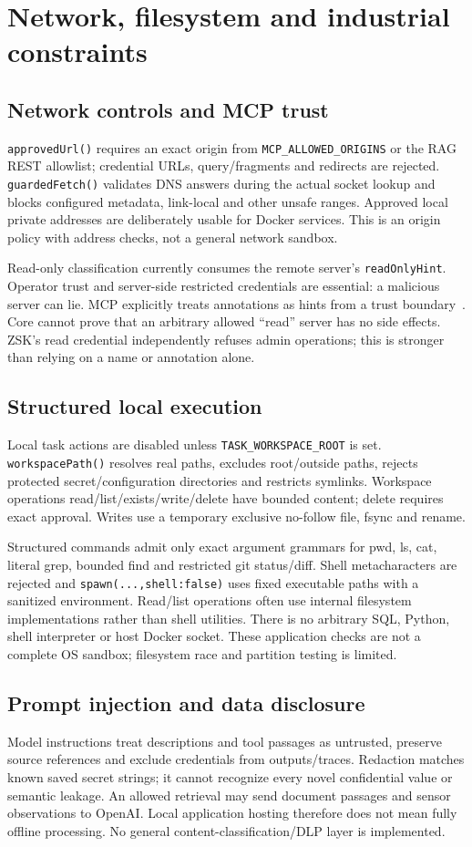 \section{Network, filesystem and industrial constraints}
\subsection{Network controls and MCP trust}
\texttt{approvedUrl()} requires an exact origin from \texttt{MCP\_ALLOWED\_ORIGINS} or the RAG REST allowlist; credential URLs, query/fragments and redirects are rejected. \texttt{guardedFetch()} validates DNS answers during the actual socket lookup and blocks configured metadata, link-local and other unsafe ranges. Approved local private addresses are deliberately usable for Docker services. This is an origin policy with address checks, not a general network sandbox.

Read-only classification currently consumes the remote server's \texttt{readOnlyHint}. Operator trust and server-side restricted credentials are essential: a malicious server can lie. MCP explicitly treats annotations as hints from a trust boundary~\cite{mcpannotations}. Core cannot prove that an arbitrary allowed ``read'' server has no side effects. ZSK's read credential independently refuses admin operations; this is stronger than relying on a name or annotation alone.
\subsection{Structured local execution}
Local task actions are disabled unless \texttt{TASK\_WORKSPACE\_ROOT} is set. \texttt{workspacePath()} resolves real paths, excludes root/outside paths, rejects protected secret/configuration directories and restricts symlinks. Workspace operations read/list/exists/write/delete have bounded content; delete requires exact approval. Writes use a temporary exclusive no-follow file, fsync and rename.

Structured commands admit only exact argument grammars for pwd, ls, cat, literal grep, bounded find and restricted git status/diff. Shell metacharacters are rejected and \texttt{spawn(...,shell:false)} uses fixed executable paths with a sanitized environment. Read/list operations often use internal filesystem implementations rather than shell utilities. There is no arbitrary SQL, Python, shell interpreter or host Docker socket. These application checks are not a complete OS sandbox; filesystem race and partition testing is limited.
\subsection{Prompt injection and data disclosure}
Model instructions treat descriptions and tool passages as untrusted, preserve source references and exclude credentials from outputs/traces. Redaction matches known saved secret strings; it cannot recognize every novel confidential value or semantic leakage. An allowed retrieval may send document passages and sensor observations to OpenAI. Local application hosting therefore does not mean fully offline processing. No general content-classification/DLP layer is implemented.
